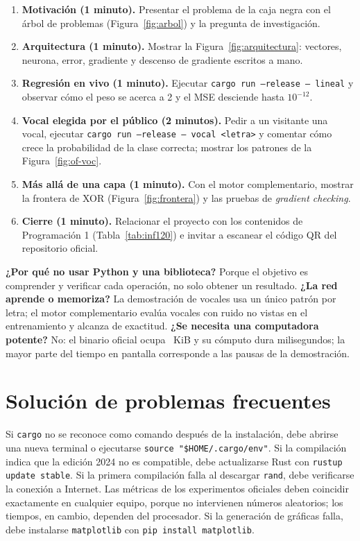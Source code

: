\begin{enumerate}[leftmargin=2em,itemsep=4pt]
\item \textbf{Motivación (1 minuto).} Presentar el problema de la caja negra con el árbol de problemas (Figura~\ref{fig:arbol}) y la pregunta de investigación.
\item \textbf{Arquitectura (1 minuto).} Mostrar la Figura~\ref{fig:arquitectura}: vectores, neurona, error, gradiente y descenso de gradiente escritos a mano.
\item \textbf{Regresión en vivo (1 minuto).} Ejecutar \texttt{cargo run --release -- lineal} y observar cómo el peso se acerca a 2 y el MSE desciende hasta $10^{-12}$.
\item \textbf{Vocal elegida por el público (2 minutos).} Pedir a un visitante una vocal, ejecutar \texttt{cargo run --release -- vocal <letra>} y comentar cómo crece la probabilidad de la clase correcta; mostrar los patrones de la Figura~\ref{fig:of-voc}.
\item \textbf{Más allá de una capa (1 minuto).} Con el motor complementario, mostrar la frontera de XOR (Figura~\ref{fig:frontera}) y las pruebas de \emph{gradient checking}.
\item \textbf{Cierre (1 minuto).} Relacionar el proyecto con los contenidos de Programación 1 (Tabla~\ref{tab:inf120}) e invitar a escanear el código QR del repositorio oficial.
\end{enumerate}

\begin{nota}
\textbf{¿Por qué no usar Python y una biblioteca?} Porque el objetivo es comprender y verificar cada operación, no solo obtener un resultado. \textbf{¿La red aprende o memoriza?} La demostración de vocales usa un único patrón por letra; el motor complementario evalúa vocales con ruido no vistas en el entrenamiento y alcanza \EtresAccPru{} de exactitud. \textbf{¿Se necesita una computadora potente?} No: el binario oficial ocupa \OfBinKiB~KiB y su cómputo dura milisegundos; la mayor parte del tiempo en pantalla corresponde a las pausas de la demostración.
\end{nota}

\section{Solución de problemas frecuentes}
Si \texttt{cargo} no se reconoce como comando después de la instalación, debe abrirse una nueva terminal o ejecutarse \texttt{source "\$HOME/.cargo/env"}. Si la compilación indica que la edición 2024 no es compatible, debe actualizarse Rust con \texttt{rustup update stable}. Si la primera compilación falla al descargar \texttt{rand}, debe verificarse la conexión a Internet. Las métricas de los experimentos oficiales deben coincidir exactamente en cualquier equipo, porque no intervienen números aleatorios; los tiempos, en cambio, dependen del procesador. Si la generación de gráficas falla, debe instalarse \texttt{matplotlib} con \texttt{pip install matplotlib}.
